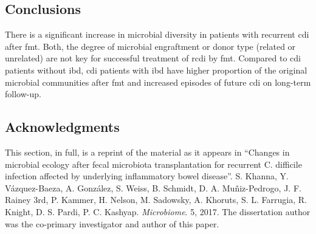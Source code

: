 \subsection{Conclusions}

There is a significant increase in microbial diversity in patients with recurrent \gls{cdi} after \gls{fmt}. Both, the degree of microbial engraftment or donor type (related or unrelated) are not key for successful treatment of \gls{rcdi} by \gls{fmt}. Compared to \gls{cdi} patients without \gls{ibd}, \gls{cdi} patients with \gls{ibd} have higher proportion of the original microbial communities after \gls{fmt} and increased episodes of future \gls{cdi} on long-term follow-up.

\subsection{Acknowledgments}

This section, in full, is a reprint of the material as it appears in ``Changes 
in microbial ecology after fecal microbiota transplantation for recurrent C.  
difficile infection affected by underlying inflammatory bowel disease''. S.  
Khanna, Y.  V\'azquez-Baeza, A.  Gonz\'alez, S. Weiss, B.  Schmidt, D. A.  
Muñiz-Pedrogo, J. F. Rainey 3rd, P. Kammer, H. Nelson, M.  Sadowsky, A.  
Khoruts, S. L. Farrugia, R. Knight, D. S.  Pardi, P. C.  Kashyap.  
\emph{Microbiome}. 5, 2017. The dissertation author was the co-primary 
investigator and author of this paper.
